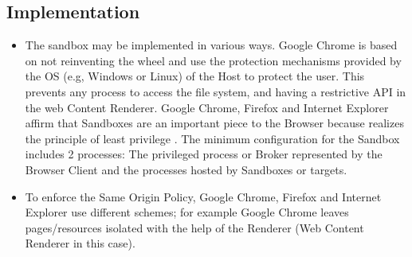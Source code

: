 \documentclass{sig-alternate-05-2015}
\begin{document}
  \subsection*{Implementation}
  \begin{itemize}
    \item The sandbox may be implemented in various ways. Google Chrome \cite{sandboxGC} is based on not reinventing the wheel and use the protection mechanisms provided by the OS (e.g, Windows or Linux) of the Host to protect the user. This prevents any process to access the file system, and having a restrictive API in the web Content Renderer. Google Chrome, Firefox and Internet Explorer affirm that Sandboxes are an important piece to the Browser because realizes the principle of least privilege \cite{Yason,sandboxGC,sandboxFirefox}. The minimum configuration for the Sandbox includes 2 processes: The privileged process or Broker represented by the Browser Client and the processes hosted by Sandboxes or targets.
    \item To enforce the Same Origin Policy, Google Chrome, Firefox and Internet Explorer use different schemes; for example Google Chrome leaves pages/resources isolated with the help of the Renderer (Web Content Renderer in this case).
  \end{itemize}
\end{document}
